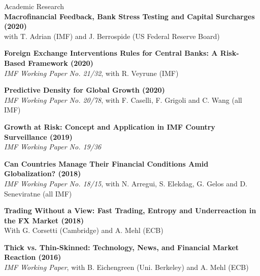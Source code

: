 \documentclass[usegeometry, 10pt, a4paper]{cv} %
\newcommand{\activite}[1]{\textbf{#1}\ }
\begin{document}
\newpage


\begin{rubriquetableau}[0.95\textwidth]{Academic Research}\\

\activite{Macrofinancial Feedback, Bank Stress Testing and Capital Surcharges (2020)} \\
\hspace{0.6cm} \small{with T. Adrian (IMF) and J. Berrospide (US Federal Reserve Board)}
\vspace{0.4cm} 
  
\activite{Foreign Exchange Interventions Rules for Central Banks: A Risk-Based Framework (2020)} \\
\hspace{0.6cm} \small{\emph{IMF Working Paper No. 21/32}, with R. Veyrune (IMF)}
\vspace{0.4cm} 
  

\activite{Predictive Density for Global Growth (2020)} \\
\hspace{0.6cm} \small{\emph{IMF Working Paper No. 20/78}, with F. Caselli, F. Grigoli and C. Wang (all IMF)}
\vspace{0.4cm} 

  
\activite{Growth at Risk: Concept and Application in IMF Country Surveillance (2019)} \\
\hspace{0.6cm} \small{\emph{IMF Working Paper No. 19/36}}
\vspace{0.4cm} 

\activite{Can Countries Manage Their Financial Conditions Amid Globalization? (2018)} \\
\hspace{0.6cm} \small{\emph{IMF Working Paper No. 18/15}, with N. Arregui, S. Elekdag, G. Gelos and D. Seneviratne (all IMF)}
\vspace{0.4cm} 

\activite{Trading Without a View: Fast Trading, Entropy and Underreaction in the FX  Market (2018)} \\
\hspace{0.6cm} \small{With G. Corsetti (Cambridge) and A. Mehl (ECB)}
\vspace{0.4cm} 


\activite{Thick vs. Thin-Skinned: Technology, News, and Financial Market Reaction (2016)} \\
\hspace{0.6cm} \small{\emph{IMF Working Paper}, with B. Eichengreen (Uni. Berkeley) and A. Mehl (ECB)}
\vspace{0.4cm} 


\end{rubriquetableau}
\end{document}
